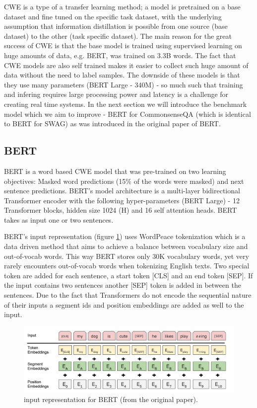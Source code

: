 \documentclass{article}
\begin{document}
CWE is a type of a transfer learning method; a model is pretrained on a base dataset and fine tuned on the specific task dataset,  with the underlying assumption that information distillation is possible from one source (base dataset) to the other (task specific dataset).
The main reason for the great success of CWE is that the base model is trained using supervised learning on huge amounts of data, e.g. BERT, was trained on 3.3B words. The fact that CWE models are also self trained makes it easier to collect such huge amount of data without the need to label samples. The downside of these models is that they use many parameters (BERT Large - 340M) - so much such that training and infering requires large processing power and latency is a challenge for creating real time systems. In the next section we will introduce the benchmark model which we aim to improve - BERT for CommonsenseQA (which is identical to BERT for SWAG) as was introduced in the original paper of BERT.

\subsection{BERT}
BERT is a word based CWE model that was pre-trained on two learning objectives: Masked word predictions (15\% of the words were masked) and next sentence predictions. BERT's model  architecture is a multi-layer bidirectional Transformer encoder \cite{vaswani2017attention} with the following hyper-parameters (BERT Large) - 12 Transformer blocks, hidden size 1024 (H) and 16 self attention heads. BERT takes as input one or two sentences.

BERT's input representation (figure \ref{bert_input_repr}) uses WordPeace \cite{wu2016google} tokenization which is a data driven method that aims to achieve a balance between vocabulary size and out-of-vocab words. This way BERT stores only 30K vocabulary words, yet very rarely encounters out-of-vocab words when tokenizing English texts. Two special token are added for each sentence, a start token [CLS] and an end token [SEP]. If the input contains two sentences another [SEP] token is added in between the sentences. Due to the fact that Transformers do not encode the sequential nature of their inputs a segment ids and position embeddings are added as well to the input.

\begin{figure}[h!]
\vskip 0.2in
\begin{center}
\centerline{\includegraphics[width=\columnwidth]{bert_input_repr}}
\caption{input representation for BERT (from the original paper).}
\label{bert_input_repr}
\end{center}
\vskip -0.2in
\end{figure}
\end{document}
